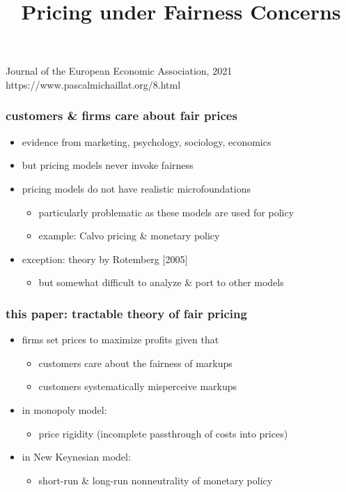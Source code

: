\documentclass[12pt,xcolor={dvipsnames},hyperref={pdftex,pdfpagemode=UseNone,hidelinks,pdfdisplaydoctitle=true},usepdftitle=false]{beamer}
\begin{document}
\title{Pricing under Fairness Concerns}
%
{Journal of the European Economic Association, 2021}%
{https://www.pascalmichaillat.org/8.html}
\frame[plain]{\titlepage}

\begin{frame}
\frametitle{customers \& firms care about fair prices}
\begin{itemize}
\item evidence from marketing, psychology, sociology, economics
\item but pricing models never invoke fairness
\item[\then] pricing models do not have realistic microfoundations
\begin{itemize}
\item particularly problematic as these models are used for policy
\item example: Calvo pricing \& monetary policy
\end{itemize}
\item exception: theory by Rotemberg [2005]
\begin{itemize}
\item but somewhat difficult to analyze \& port to other models
\end{itemize}
\end{itemize}
\end{frame}

\begin{frame}
\frametitle{this paper: tractable theory of fair pricing}
\begin{itemize}
\item firms set prices to maximize profits given that
\begin{itemize}
	\item customers care about the fairness of markups
	\item customers systematically misperceive markups
\end{itemize}
\item in monopoly model:
	\begin{itemize}
		\item price rigidity (incomplete passthrough of costs into prices)
	\end{itemize}
\item in New Keynesian model:
\begin{itemize}
	\item short-run \& long-run nonneutrality of monetary policy 
\end{itemize}
\end{itemize}
\end{frame}
\end{document}
